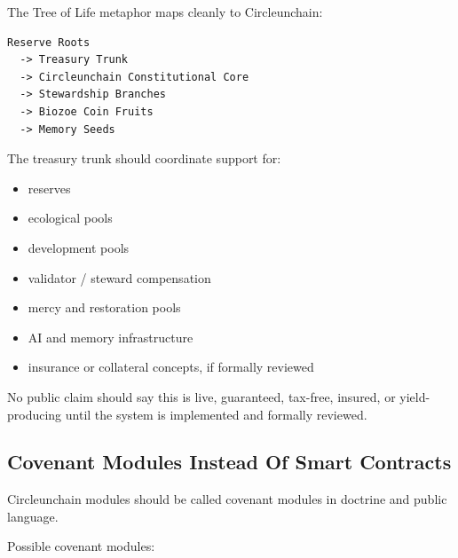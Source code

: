 ﻿\documentclass[12pt]{article}
\begin{document}
The Tree of Life metaphor maps cleanly to Circleunchain:

\begin{verbatim}
Reserve Roots
  -> Treasury Trunk
  -> Circleunchain Constitutional Core
  -> Stewardship Branches
  -> Biozoe Coin Fruits
  -> Memory Seeds
\end{verbatim}

The treasury trunk should coordinate support for:

\begin{itemize}
  \item reserves
\end{itemize}
\begin{itemize}
  \item ecological pools
\end{itemize}
\begin{itemize}
  \item development pools
\end{itemize}
\begin{itemize}
  \item validator / steward compensation
\end{itemize}
\begin{itemize}
  \item mercy and restoration pools
\end{itemize}
\begin{itemize}
  \item AI and memory infrastructure
\end{itemize}
\begin{itemize}
  \item insurance or collateral concepts, if formally reviewed
\end{itemize}

No public claim should say this is live, guaranteed, tax-free, insured, or yield-producing until the system is implemented and formally reviewed.

\subsection{Covenant Modules Instead Of Smart Contracts}


Circleunchain modules should be called covenant modules in doctrine and public language.

Possible covenant modules:
\end{document}
